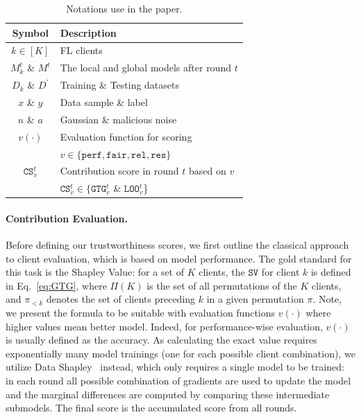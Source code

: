 \documentclass{uai2026}
\begin{document}
\begin{table}[!b]
    \centering
    \begin{tabular}{c|l}
        Symbol & Description \\
        \hline
        $k\in[K]$ & FL clients \\
        $M_k^t$ \& $M^t$ & The local and global models after round $t$ \\
        $D_k$ \& $D^\prime$ & Training \& Testing datasets \\
        $x$ \& $y$ & Data sample \& label \\
        $n$ \& $a$ & Gaussian \& malicious noise \\
        $v(\cdot)$ & Evaluation function for scoring \\
        & $v\in \{\mathtt{perf}, \mathtt{fair}, \mathtt{rel}, \mathtt{res}\}$\\
        $\mathtt{CS}^t_v$ & Contribution score in round $t$ based on $v$ \\
        & $\mathtt{CS}^t_v\in\{\mathtt{GTG}^t_v$ \& $\mathtt{LOO}^t_v$\} \\
    \end{tabular}
    \caption{Notations use in the paper.}
    \label{tab:notations}
\end{table}

\paragraph{Contribution Evaluation. }

Before defining our trustworthiness scores, we first outline the classical approach to client evaluation, which is based on model performance. The gold standard for this task is the Shapley Value: for a set of $K$ clients, the $\mathtt{SV}$ for client $k$ is defined in Eq.~\eqref{eq:GTG}, where $\Pi(K)$ is the set of all permutations of the $K$ clients, and $\pi_{<k}$ denotes the set of clients preceding $k$ in a given permutation $\pi$. Note, we present the formula to be suitable with evaluation functions $v(\cdot)$ where higher values mean better model. Indeed, for performance-wise evaluation, $v(\cdot)$ is usually defined as the accuracy. As calculating the exact value requires exponentially many model trainings (one for each possible client combination), we utilize Data Shapley~\cite{ghorbani2019data} instead, which only requires a single model to be trained: in each round all possible combination of gradients are used to update the model and the marginal differences are computed by comparing these intermediate submodels. The final score is the accumulated score from all rounds.
\end{document}
